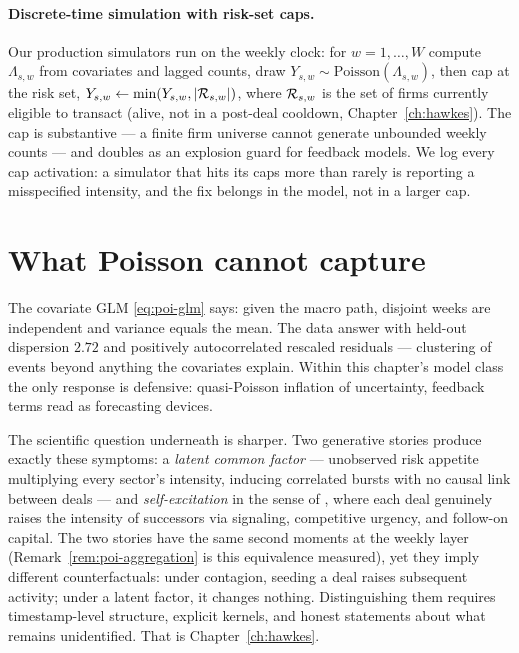 \paragraph{Discrete-time simulation with risk-set caps.}
Our production simulators run on the weekly clock: for $w = 1, \dots, W$ compute
$\Lambda_{s,w}$ from covariates and lagged counts, draw
$Y_{s,w} \sim \mathrm{Poisson}(\Lambda_{s,w})$, then cap at the risk set,
$Y_{s,w} \leftarrow \min(Y_{s,w}, |\mathcal{R}_{s,w}|)$, where $\mathcal{R}_{s,w}$ is the set of firms
currently eligible to transact (alive, not in a post-deal cooldown,
Chapter~\ref{ch:hawkes}). The cap is substantive --- a finite firm universe cannot
generate unbounded weekly counts --- and doubles as an explosion guard for feedback
models. We log every cap activation: a simulator that hits its caps more than rarely is
reporting a misspecified intensity, and the fix belongs in the model, not in a larger cap.

\section{What Poisson cannot capture}
\label{sec:poi-limits}

The covariate GLM \eqref{eq:poi-glm} says: given the macro path, disjoint weeks are
independent and variance equals the mean. The data answer with held-out dispersion $2.72$
and positively autocorrelated rescaled residuals --- clustering of events beyond anything
the covariates explain. Within this chapter's model class the only response is defensive:
quasi-Poisson inflation of uncertainty, feedback terms read as forecasting devices.

The scientific question underneath is sharper. Two generative stories produce exactly
these symptoms: a \emph{latent common factor} --- unobserved risk appetite multiplying
every sector's intensity, inducing correlated bursts with no causal link between deals ---
and \emph{self-excitation} in the sense of \cite{hawkes1971}, where each deal genuinely
raises the intensity of successors via signaling, competitive urgency, and follow-on
capital. The two stories have the same second moments at
the weekly layer (Remark~\ref{rem:poi-aggregation} is this equivalence measured), yet they
imply different counterfactuals: under contagion, seeding a deal raises subsequent
activity; under a latent factor, it changes nothing. Distinguishing them requires
timestamp-level structure, explicit kernels, and honest statements about what remains
unidentified. That is Chapter~\ref{ch:hawkes}.
